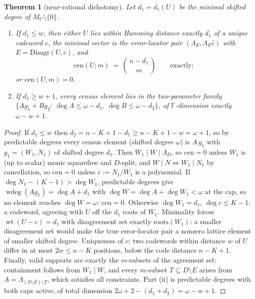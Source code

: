 \documentclass[11pt]{article}
\newtheorem{theorem}{Theorem}[section]
\theoremstyle{definition}
\theoremstyle{remark}
\newcommand{\F}{\mathbb{F}}
\begin{document}
\begin{theorem}[near-rational dichotomy]\label{thm:capfp-dichotomy}
Let $d_1=d_1(U)$ be the minimal shifted degree of $M_U\setminus\{0\}$.
\begin{enumerate}[label=\textup{(\roman*)}]
\item If $d_1\le w$, then either $U$ lies within Hamming distance exactly $d_1$ of a \emph{unique} codeword $c$, the minimal vector is the error-locator pair $(\Lambda_E,\Lambda_E\hat c)$ with $E=\mathrm{Disagr}(U,c)$, and
\[
        \mathrm{cen}(U;m)\ =\ \binom{\,n-d_1\,}{m}\qquad\text{exactly};
\]
or $\mathrm{cen}(U;m)=0$.
\item If $d_1\ge w+1$, every census element lies in the two-parameter family $\{Ag_1+Bg_2:\ \deg A\le\omega-d_1,\ \deg B\le\omega-d_2\}$, of $\F$-dimension exactly $\omega-w+1$.
\end{enumerate}
\end{theorem}

\begin{proof}
If $d_1\le w$ then $d_2=n-K+1-d_1\ge n-K+1-w=\omega+1$, so by predictable degrees every census element \textup(shifted degree $\omega$\textup) is $A\,g_1$ with $g_1=(W_1,N_1)$ of shifted degree $d_1$.  Then $W_1\mid W\mid\Lambda_D$, so $\mathrm{cen}=0$ unless $W_1$ is \textup(up to scalar\textup) monic squarefree and $D$-split; and $W\mid N\iff W_1\mid N_1$ by cancellation, so $\mathrm{cen}=0$ unless $c:=N_1/W_1$ is a polynomial.  If $\deg N_1-(K-1)>\deg W_1$, predictable degrees give $\operatorname{wdeg}(Ag_1)=\deg A+d_1$ with $\deg W=\deg A+\deg W_1<\omega$ at the cap, so no element reaches $\deg W=\omega$: $\mathrm{cen}=0$.  Otherwise $\deg W_1=d_1$, $\deg c\le K-1$: a codeword, agreeing with $U$ off the $d_1$ roots of $W_1$.  Minimality forces $\operatorname{wt}(U-c)=d_1$ with disagreement set exactly $\mathrm{roots}(W_1)$: a smaller disagreement set would make the true error-locator pair a nonzero lattice element of smaller shifted degree.  Uniqueness of $c$: two codewords within distance $w$ of $U$ differ in at most $2w\le n-K$ positions, below the code distance $n-K+1$.  Finally, valid supports are exactly the $m$-subsets of the agreement set: containment follows from $W_1\mid W$, and every $m$-subset $T\subseteq D\setminus E$ arises from $A=\Lambda_{(D\setminus E)\setminus T}$, which satisfies all constraints.  Part \textup{(ii)} is predictable degrees with both caps active, of total dimension $2\omega+2-(d_1+d_2)=\omega-w+1$.
\end{proof}
\end{document}

